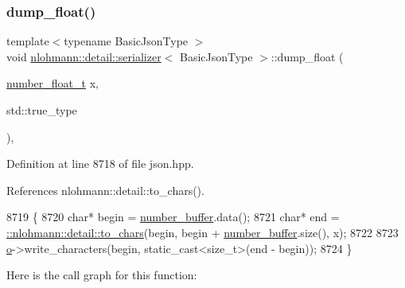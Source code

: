 \subsubsection{\texorpdfstring{dump\+\_\+float()}{dump\_float()}\hspace{0.1cm}{\footnotesize\ttfamily [2/3]}}
{\footnotesize\ttfamily template$<$typename Basic\+Json\+Type $>$ \\
void \hyperlink{classnlohmann_1_1detail_1_1serializer}{nlohmann\+::detail\+::serializer}$<$ Basic\+Json\+Type $>$\+::dump\+\_\+float (\begin{DoxyParamCaption}\item[{\hyperlink{classnlohmann_1_1detail_1_1serializer_a460c6794fbabbb2ae83380e987a6c030}{number\+\_\+float\+\_\+t}}]{x,  }\item[{std\+::true\+\_\+type}]{ }\end{DoxyParamCaption})\hspace{0.3cm}{\ttfamily [inline]}, {\ttfamily [private]}}



Definition at line 8718 of file json.\+hpp.



References nlohmann\+::detail\+::to\+\_\+chars().


\begin{DoxyCode}
8719     \{
8720         \textcolor{keywordtype}{char}* begin = \hyperlink{classnlohmann_1_1detail_1_1serializer_a1a9d8b344a6cb47728a3519693ec03d1}{number\_buffer}.data();
8721         \textcolor{keywordtype}{char}* end = \hyperlink{namespacenlohmann_1_1detail_a6192f1eab05fbbc5c35edb8368c8fc57}{::nlohmann::detail::to\_chars}(begin, begin + 
      \hyperlink{classnlohmann_1_1detail_1_1serializer_a1a9d8b344a6cb47728a3519693ec03d1}{number\_buffer}.size(), x);
8722 
8723         \hyperlink{classnlohmann_1_1detail_1_1serializer_acf3c88660d3cbc65fc71c4d84f2a9f59}{o}->write\_characters(begin, static\_cast<size\_t>(end - begin));
8724     \}
\end{DoxyCode}
Here is the call graph for this function\+:
\mbox{\label{classnlohmann_1_1detail_1_1serializer_a331dad892fc00313f928fdaa6bc8f849}} 
